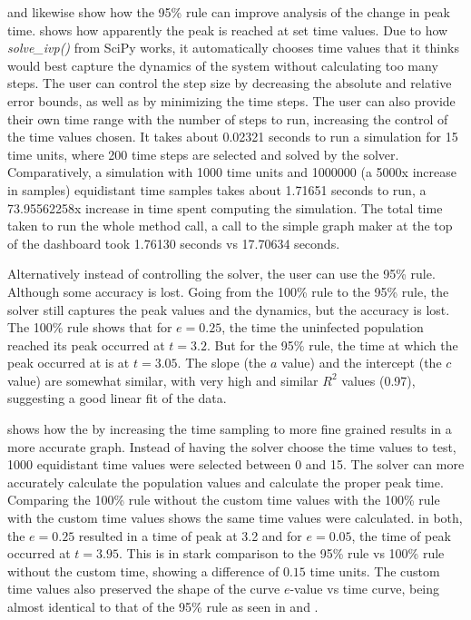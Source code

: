  and  likewise show how the 95\% rule can improve analysis of the change in peak time. 
 shows how apparently the peak is reached at set time values. 
Due to how \textit{solve\_ivp()} from SciPy works, it automatically chooses time values that it thinks would best capture the dynamics of the system without calculating too many steps. 
The user can control the step size by decreasing the absolute and relative error bounds, as well as by minimizing the time steps. 
The user can also provide their own time range with the number of steps to run, increasing the control of the time values chosen. 
It takes about 0.02321 seconds to run a simulation for 15 time units, where 200 time steps are selected and solved by the solver. 
Comparatively, a simulation with 1000 time units and 1000000 (a 5000x increase in samples) equidistant time samples takes about 1.71651 seconds to run, a 73.95562258x increase in time spent computing the simulation. 
The total time taken to run the whole method call, a call to the simple graph maker at the top of the dashboard took 1.76130 seconds vs 17.70634 seconds. 



Alternatively instead of controlling the solver, the user can use the 95\% rule.
Although some accuracy is lost. 
Going from the 100\% rule to the 95\% rule, the solver still captures the peak values and the dynamics, but the accuracy is lost. 
The 100\% rule shows that for $e=0.25$, the time the uninfected population reached its peak occurred at $t=3.2$. 
But for the 95\% rule, the time at which the peak occurred at is at $t=3.05$. 
The slope (the $a$ value) and the intercept (the $c$ value) are somewhat similar, with very high and similar $R^2$ values (0.97), suggesting a good linear fit of the data. 

 shows how the by increasing the time sampling to more fine grained results in a more accurate graph. 
Instead of having the solver choose the time values to test, 1000 equidistant time values were selected between 0 and 15. 
The solver can more accurately calculate the population values and calculate the proper peak time. 
Comparing the 100\% rule without the custom time values with the 100\% rule with the custom time values shows the same time values were calculated. 
in both, the $e=0.25$ resulted in a time of peak at 3.2 and for $e=0.05$, the time of peak occurred at $t=3.95$. 
This is in stark comparison to the 95\% rule vs 100\% rule without the custom time, showing a difference of $0.15$ time units. 
The custom time values also preserved the shape of the curve $e$-value vs time curve, being almost identical to that of the 95\% rule as seen in  and . 

